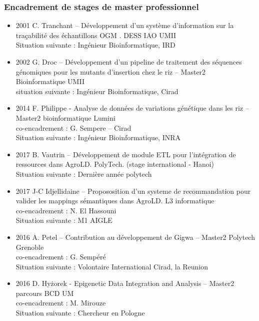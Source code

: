 \subsubsection*{Encadrement de stages de master professionnel}
\begin{itemize}
\item 2001 C. Tranchant – Développement d’un système d’information sur la traçabilité des échantillons OGM . DESS IAO UMII \\
Situation suivante : Ingénieur Bioinformatique, IRD

\item 2002 G. Droc – Développement d’un pipeline de traitement des séquences génomiques pour les mutants d’insertion chez le riz – Master2 Bioinformatique UMII\\
situation suivante : Ingénieur Bioinformatique, Cirad

\item 2014 F. Philippe -  Analyse de données de variations génétique dans les riz – Master2 bioinformatique Lumini \\
co-encadrement : G. Sempere – Cirad \\
Situation suivante : Ingénieur Bioinformatique, INRA

\item 2017 B. Vautrin – Développement de module ETL pour l’intégration de ressources dans AgroLD. PolyTech. (stage international - Hanoi) \\
Situation suivante : Dernière année polytech 

\item 2017 J-C Idjellidaine – Propososition d’un systeme de recommandation pour valider les mappings sémantiques dans AgroLD. L3 informatique \\
co-encadrement : N. El Hassouni \\
Situation suivante : M1 AIGLE 

\item 2016 A. Petel – Contribution au développement de Gigwa – Master2 Polytech Grenoble \\
co-encadrement : G. Sempéré \\
Situation suivante : Volontaire International Cirad, la Reunion

\item 2016 D. Hyżorek - Epigenetic Data Integration and Analysis – Master2 parcours BCD UM \\
co-encadrement : M. Mirouze \\
Situation suivante : Chercheur en Pologne
\end{itemize}


